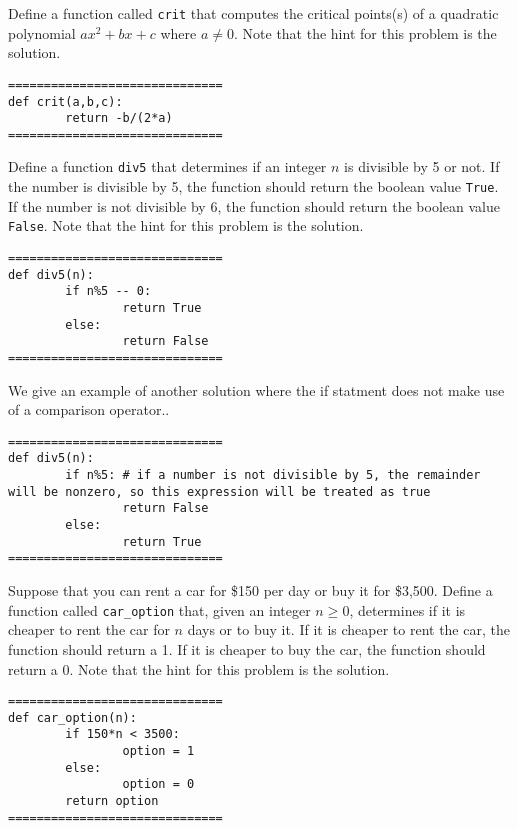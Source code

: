 \documentclass{ximera}
\begin{document}
\begin{question}
	Define a function called \verb|crit| that computes the critical points(s) of a quadratic polynomial $ax^2+bx+c$ where $a\neq 0$. Note that the hint for this problem is the solution.
	\begin{hint}
\begin{verbatim}
==============================
def crit(a,b,c):
        return -b/(2*a)
==============================
\end{verbatim}
	\end{hint}
\end{question}

\begin{question}
	Define a function \verb|div5| that determines if an integer $n$ is divisible by 5 or not. If the number is divisible by 5, the function should return the boolean value \verb|True|. If the number is not divisible by 6, the function should return the boolean value \verb|False|.  Note that the hint for this problem is the solution.
	\begin{hint}
\begin{verbatim}
==============================
def div5(n):
        if n%5 -- 0:
                return True
        else:
                return False
==============================
\end{verbatim}
We give an example of another solution where the if statment does not make use of a comparison operator..

\begin{verbatim}
==============================
def div5(n):
        if n%5: # if a number is not divisible by 5, the remainder will be nonzero, so this expression will be treated as true
                return False
        else:
                return True
==============================
\end{verbatim}
	\end{hint}
\end{question}

\begin{question}
	Suppose that you can rent a car for \$150 per day or buy it for \$3,500. Define a function called \verb|car_option| that, given an integer $n\geq 0$, determines if it is cheaper to rent the car for $n$ days or to buy it. If it is cheaper to rent the car, the function should return a 1. If it is cheaper to buy the car, the function should return a 0. Note that the hint for this problem is the solution.
	\begin{hint}
\begin{verbatim}
==============================
def car_option(n):
        if 150*n < 3500:
                option = 1
        else:
                option = 0
        return option
==============================
\end{verbatim}
	\end{hint}
\end{question}
\end{document}
